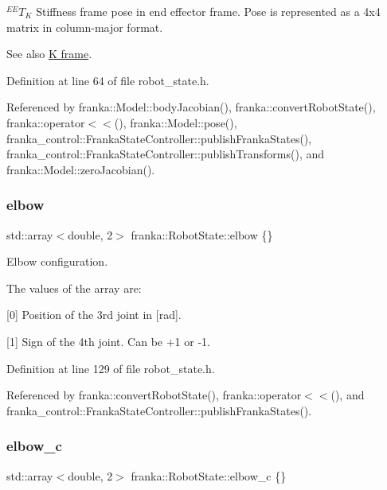 $^{EE}T_{K}$ Stiffness frame pose in end effector frame. Pose is represented as a 4x4 matrix in column-\/major format.

See also \hyperlink{classfranka_1_1Robot_k-frame}{K frame}. 

Definition at line 64 of file robot\+\_\+state.\+h.



Referenced by franka\+::\+Model\+::body\+Jacobian(), franka\+::convert\+Robot\+State(), franka\+::operator$<$$<$(), franka\+::\+Model\+::pose(), franka\+\_\+control\+::\+Franka\+State\+Controller\+::publish\+Franka\+States(), franka\+\_\+control\+::\+Franka\+State\+Controller\+::publish\+Transforms(), and franka\+::\+Model\+::zero\+Jacobian().

\mbox{\label{structfranka_1_1RobotState_a43485841c427d70e7f36a912cc3116d1}} 
\subsubsection{\texorpdfstring{elbow}{elbow}}
{\footnotesize\ttfamily std\+::array$<$double, 2$>$ franka\+::\+Robot\+State\+::elbow \{\}}

Elbow configuration.

The values of the array are\+:
\begin{DoxyItemize}
\item \mbox{[}0\mbox{]} Position of the 3rd joint in \mbox{[}rad\mbox{]}.
\item \mbox{[}1\mbox{]} Sign of the 4th joint. Can be +1 or -\/1. 
\end{DoxyItemize}

Definition at line 129 of file robot\+\_\+state.\+h.



Referenced by franka\+::convert\+Robot\+State(), franka\+::operator$<$$<$(), and franka\+\_\+control\+::\+Franka\+State\+Controller\+::publish\+Franka\+States().

\mbox{\label{structfranka_1_1RobotState_a16cfc844894e8b5b1ad829be529962f0}} 
\subsubsection{\texorpdfstring{elbow\+\_\+c}{elbow\_c}}
{\footnotesize\ttfamily std\+::array$<$double, 2$>$ franka\+::\+Robot\+State\+::elbow\+\_\+c \{\}}

